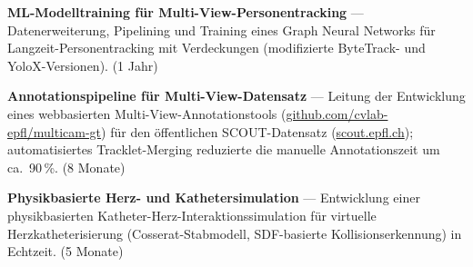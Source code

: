 \documentclass[a4paper,10pt]{article}
\newlength{\mainwidth}
\newlength{\mainpadding}
\begin{document}
\begin{minipage}[t][\textheight]{\mainwidth}
\begin{minipage}[t]{\dimexpr\mainwidth-2\mainpadding\relax}
    {\color{mainText}\small
      \textbf{ML-Modelltraining f\"ur Multi-View-Personentracking} ---
      Datenerweiterung, Pipelining und Training eines Graph Neural Networks f\"ur
      Langzeit-Personentracking mit Verdeckungen (modifizierte ByteTrack- und
      YoloX-Versionen). (1 Jahr)
    }
    \vspace{6pt}

    {\color{mainText}\small
      \textbf{Annotationspipeline f\"ur Multi-View-Datensatz} ---
      Leitung der Entwicklung eines webbasierten Multi-View-Annotationstools
      (\href{https://github.com/cvlab-epfl/multicam-gt}{github.com/cvlab-epfl/multicam-gt})
      f\"ur den \"offentlichen SCOUT-Datensatz
      (\href{https://scout.epfl.ch/}{scout.epfl.ch});
      automatisiertes Tracklet-Merging reduzierte die manuelle Annotationszeit um ca.\ 90\,\%.
      (8 Monate)
    }
    \vspace{6pt}

    {\color{mainText}\small
      \textbf{Physikbasierte Herz- und Kathetersimulation} ---
      Entwicklung einer physikbasierten Katheter-Herz-Interaktionssimulation f\"ur virtuelle
      Herzkatheterisierung (Cosserat-Stabmodell, SDF-basierte Kollisionserkennung) in Echtzeit.
      (5 Monate)
    }

  \end{minipage}
\end{minipage}
\end{document}
